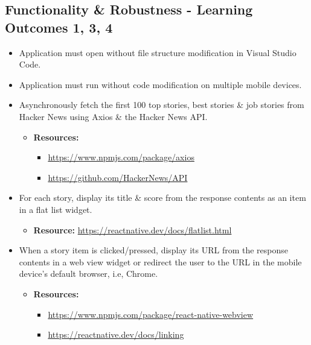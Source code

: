 \documentclass{article}
\begin{document}
\subsection*{Functionality \& Robustness - Learning Outcomes 1, 3, 4}
\begin{itemize}
    \item Application must open without file structure modification in Visual Studio Code.
    \item Application must run without code modification on multiple mobile devices.
    \item Asynchronously fetch the first 100 top stories, best stories \& job stories from Hacker News using Axios \& the Hacker News API.
    \begin{itemize}
        \item \textbf{Resources:}
        \begin{itemize}
            \item \footnotesize\href{https://www.npmjs.com/package/axios}{https://www.npmjs.com/package/axios}
            \item \footnotesize\href{https://github.com/HackerNews/API}{https://github.com/HackerNews/API}
        \end{itemize}
    \end{itemize}
    \item For each story, display its title \& score from the response contents as an item in a flat list widget.
    \begin{itemize}
        \item \textbf{Resource:} \footnotesize\href{https://reactnative.dev/docs/flatlist.html}{https://reactnative.dev/docs/flatlist.html}
    \end{itemize}
    \item When a story item is clicked/pressed, display its URL from the response contents in a web view widget or redirect the user to the URL in the mobile device's default browser, i.e, Chrome.
    \begin{itemize}
        \item \textbf{Resources:} 
        \begin{itemize} 
            \item \footnotesize\href{https://www.npmjs.com/package/react-native-webview}{https://www.npmjs.com/package/react-native-webview}
            \item \footnotesize\href{https://reactnative.dev/docs/linking}{https://reactnative.dev/docs/linking}
        \end{itemize}

\end{itemize}
\end{itemize}
\end{document}
